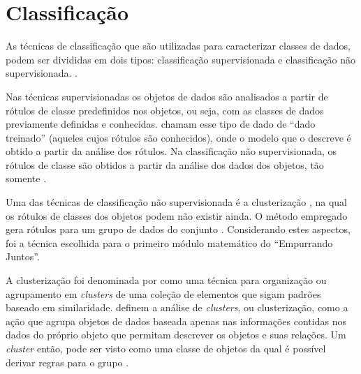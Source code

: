 

\chapter{Classificação} \label{cap:classificação}

As técnicas de classificação que são utilizadas para caracterizar classes de dados, podem
ser divididas em dois tipos: classificação supervisionada e classificação não supervisionada. \cite{tan2013data, han2011data, clustering_review}.

Nas técnicas supervisionadas os objetos de dados são analisados a partir de rótulos de classe predefinidos nos objetos, ou seja, 
com as classes de dados previamente definidas e conhecidas.  chamam esse tipo de dado de ``dado treinado''
(aqueles cujos rótulos são conhecidos), onde o modelo que o descreve é obtido a partir da análise dos rótulos.
Na classificação não supervisionada, os rótulos de classe são obtidos a partir da análise dos dados dos objetos, tão somente \cite{tan2013data}.

Uma das técnicas de classificação não supervisionada é a clusterização \cite{clustering_review, tan2013data}, na qual os rótulos de classes dos objetos 
podem não existir ainda. O método empregado gera rótulos para um grupo de dados do conjunto \cite{han2011data}. Considerando estes aspectos, 
foi a técnica escolhida para o primeiro módulo matemático do ``Empurrando Juntos''. 

A clusterização foi denominada por  como uma técnica para organização ou agrupamento em \textit{clusters} 
de uma coleção de elementos que sigam padrões baseado em similaridade.
 definem a análise de \textit{clusters}, ou clusterização, como a ação que agrupa objetos de dados
baseada apenas nas informações contidas nos dados do próprio objeto que permitam descrever os objetos e suas relações. Um \textit{cluster}
então, pode ser visto como uma classe de objetos da qual é possível derivar regras para o grupo \cite{han2011data}.


